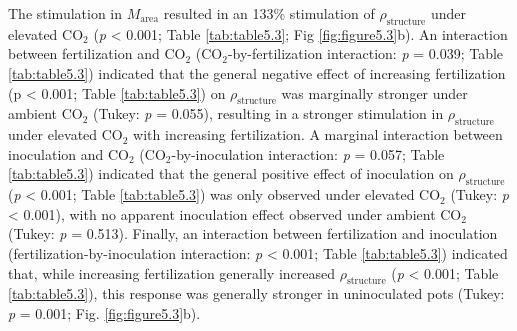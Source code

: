 The stimulation in $M_\mathrm{area}$ resulted in an 133\% stimulation of $\rho_\mathrm{structure}$ under elevated CO$_2$ (\textit{p} < 0.001; Table \ref{tab:table5.3}; Fig \ref{fig:figure5.3}b). An interaction between fertilization and CO$_2$ (CO$_2$-by-fertilization interaction: \textit{p} = 0.039; Table \ref{tab:table5.3}) indicated that the general negative effect of increasing fertilization (p < 0.001; Table \ref{tab:table5.3}) on $\rho_\mathrm{structure}$ was marginally stronger under ambient CO$_2$ (Tukey: \textit{p} = 0.055), resulting in a stronger stimulation in $\rho_\mathrm{structure}$ under elevated CO$_2$ with increasing fertilization. A marginal interaction between inoculation and CO$_2$ (CO$_2$-by-inoculation interaction: \textit{p} = 0.057; Table \ref{tab:table5.3}) indicated that the general positive effect of inoculation on $\rho_\mathrm{structure}$ (\textit{p} < 0.001; Table \ref{tab:table5.3}) was only observed under elevated CO$_2$ (Tukey: \textit{p} < 0.001), with no apparent inoculation effect observed under ambient CO$_2$ (Tukey: \textit{p} = 0.513). Finally, an interaction between fertilization and inoculation (fertilization-by-inoculation interaction: \textit{p} < 0.001; Table \ref{tab:table5.3}) indicated that, while increasing fertilization generally increased $\rho_\mathrm{structure}$ (\textit{p} < 0.001; Table \ref{tab:table5.3}), this response was generally stronger in uninoculated pots (Tukey: \textit{p} = 0.001; Fig. \ref{fig:figure5.3}b).

